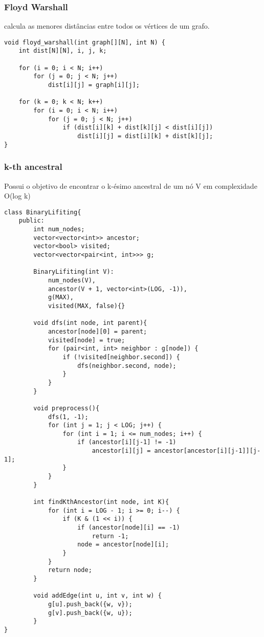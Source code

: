 \subsubsection{Floyd Warshall} calcula as menores distâncias entre todos os vértices de um grafo.
    \begin{verbatim}
void floyd_warshall(int graph[][N], int N) {
    int dist[N][N], i, j, k;

    for (i = 0; i < N; i++)
        for (j = 0; j < N; j++)
            dist[i][j] = graph[i][j];

    for (k = 0; k < N; k++) 
        for (i = 0; i < N; i++) 
            for (j = 0; j < N; j++) 
                if (dist[i][k] + dist[k][j] < dist[i][j])
                    dist[i][j] = dist[i][k] + dist[k][j];
}
    \end{verbatim}

\subsubsection{k-th ancestral} Possui o objetivo de encontrar o k-ésimo ancestral de um nó V em complexidade O(log k)
    \begin{verbatim}
class BinaryLifiting{
    public: 
        int num_nodes;
        vector<vector<int>> ancestor;
        vector<bool> visited;
        vector<vector<pair<int, int>>> g;

        BinaryLifiting(int V): 
            num_nodes(V), 
            ancestor(V + 1, vector<int>(LOG, -1)),
            g(MAX), 
            visited(MAX, false){}

        void dfs(int node, int parent){
            ancestor[node][0] = parent;
            visited[node] = true;
            for (pair<int, int> neighbor : g[node]) {
                if (!visited[neighbor.second]) {
                    dfs(neighbor.second, node);
                }
            }
        }

        void preprocess(){
            dfs(1, -1);
            for (int j = 1; j < LOG; j++) {
                for (int i = 1; i <= num_nodes; i++) {
                    if (ancestor[i][j-1] != -1)
                        ancestor[i][j] = ancestor[ancestor[i][j-1]][j-1];
                }
            }
        }

        int findKthAncestor(int node, int K){
            for (int i = LOG - 1; i >= 0; i--) {
                if (K & (1 << i)) {
                    if (ancestor[node][i] == -1)
                        return -1;
                    node = ancestor[node][i];
                }
            }
            return node;
        }

        void addEdge(int u, int v, int w) {
            g[u].push_back({w, v});
            g[v].push_back({w, u});
        }
}
    \end{verbatim}
\pagebreak
